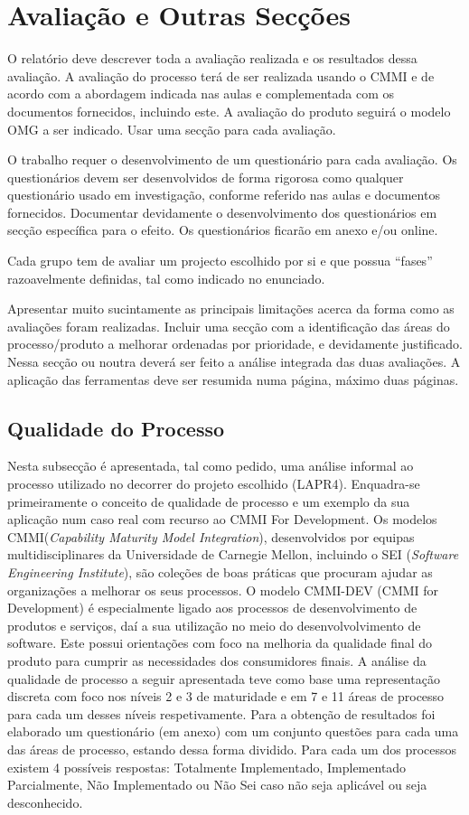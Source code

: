 \documentclass[openany,10pt,a4paper]{article}
\begin{document}
\section{Avaliação e Outras Secções}
O relatório deve descrever toda a avaliação realizada e os resultados dessa avaliação. A avaliação do processo terá de ser realizada usando o CMMI e de acordo com a abordagem indicada nas aulas e complementada com os documentos fornecidos, incluindo este. A avaliação do produto seguirá o modelo OMG a ser indicado. Usar uma secção para cada avaliação.

O trabalho requer o desenvolvimento de um questionário para cada avaliação. Os questionários devem ser desenvolvidos de forma rigorosa como qualquer questionário usado em investigação, conforme referido nas aulas e documentos fornecidos. Documentar devidamente o desenvolvimento dos questionários em secção específica para o efeito. Os questionários ficarão em anexo e/ou online.

Cada grupo tem de avaliar um projecto escolhido por si e que possua “fases” razoavelmente definidas, tal como indicado no enunciado.

Apresentar muito sucintamente as principais limitações acerca da forma como as avaliações foram realizadas. Incluir uma secção com a identificação das áreas do processo/produto a melhorar ordenadas por prioridade, e devidamente justificado. Nessa secção ou noutra deverá ser feito a análise integrada das duas avaliações. A aplicação das ferramentas deve ser resumida numa página, máximo duas páginas.

\subsection{Qualidade do Processo}
Nesta subsecção é apresentada, tal como pedido, uma análise informal ao processo utilizado no decorrer do projeto escolhido (LAPR4). Enquadra-se primeiramente o conceito de qualidade de processo e um exemplo da sua aplicação num caso real com recurso ao CMMI For Development.
Os modelos CMMI(\textit{Capability Maturity Model Integration}), desenvolvidos por equipas multidisciplinares da Universidade de Carnegie Mellon, incluindo o SEI (\textit{Software Engineering Institute}), são coleções de boas práticas que procuram ajudar as organizações a melhorar os seus processos. O modelo CMMI-DEV (CMMI for Development) é especialmente ligado aos processos de desenvolvimento de produtos e serviços, daí a sua utilização no meio do desenvolvolvimento de software. Este possui orientações com foco na melhoria da qualidade final do produto para cumprir as necessidades dos consumidores finais. \cite{CMMIProductTeam2010} 
A análise da qualidade de processo a seguir apresentada teve como base uma representação discreta com foco nos níveis 2 e 3 de maturidade e em 7 e 11 áreas de processo para cada um desses níveis respetivamente. Para a obtenção de resultados foi elaborado um questionário (em anexo) com um conjunto questões para cada uma das áreas de processo, estando dessa forma dividido. Para cada um dos processos existem 4 possíveis respostas: Totalmente Implementado, Implementado Parcialmente, Não Implementado ou Não Sei caso não seja aplicável ou seja desconhecido.
\end{document}
